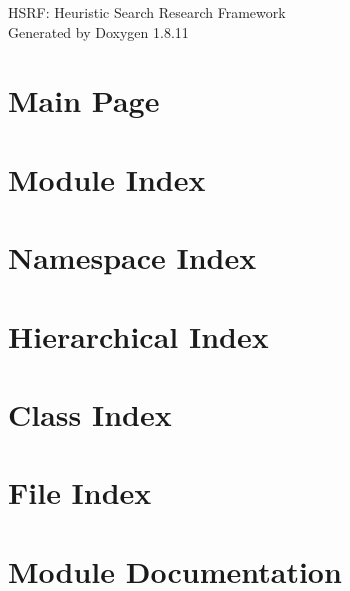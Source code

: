 \documentclass[twoside]{article}
\newcommand{\+}{\discretionary{\mbox{\scriptsize$\hookleftarrow$}}{}{}}
\begin{document}
\hypersetup{pageanchor=false,
             bookmarksnumbered=true,
             pdfencoding=unicode
            }
\begin{titlepage}
\vspace*{7cm}
\begin{center}%
{\Large H\+S\+RF\+: Heuristic Search Research Framework }\\
\vspace*{1cm}
{\large Generated by Doxygen 1.8.11}\\
\end{center}
\end{titlepage}
\tableofcontents
{}
\hypersetup{pageanchor=true}

\section{Main Page}
\label{index}\hypertarget{index}{}
\section{Module Index}

\section{Namespace Index}

\section{Hierarchical Index}

\section{Class Index}

\section{File Index}

\section{Module Documentation}

\end{document}
